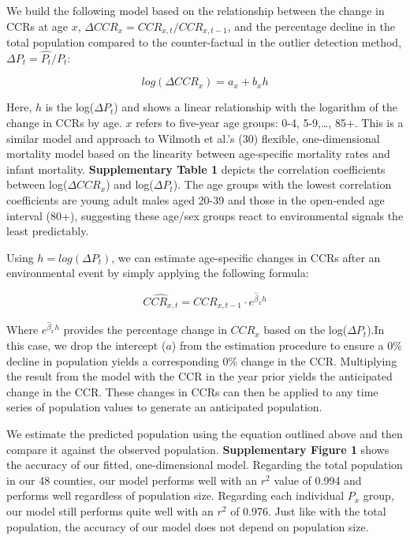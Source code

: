 \documentclass[9pt,twocolumn,twoside,]{pnas-new}
\begin{document}
We build the following model based on the relationship between the
change in CCRs at age \(x\), \(\Delta CCR_x = CCR_{x,t} / CCR_{x,t-1}\),
and the percentage decline in the total population compared to the
counter-factual in the outlier detection method,
\(\Delta P_t = \hat{P_t} / P_t\):

\[log(\Delta CCR_x) = a_x + b_xh \tag{3}\]

Here, \(h\) is the log(\(\Delta P_t\)) and shows a linear relationship
with the logarithm of the change in CCRs by age. \(x\) refers to
five-year age groups: 0-4, 5-9,\ldots, 85+. This is a similar model and
approach to Wilmoth et al.'s (30) flexible, one-dimensional mortality
model based on the linearity between age-specific mortality rates and
infant mortality. \textbf{Supplementary Table 1} depicts the correlation
coefficients between log(\(\Delta CCR_x\)) and log(\(\Delta P_t\)). The
age groups with the lowest correlation coefficients are young adult
males aged 20-39 and those in the open-ended age interval (80+),
suggesting these age/sex groups react to environmental signals the least
predictably.

Using \(h=log(\Delta P_t)\), we can estimate age-specific changes in
CCRs after an environmental event by simply applying the following
formula:

\[\hat{CCR_{x,t}} = CCR_{x,t-1} \cdot e^{\hat\beta_xh} \tag{4}\]

Where \(e^{\hat\beta_xh}\) provides the percentage change in \(CCR_x\)
based on the log(\(\Delta{P_t}\)).In this case, we drop the intercept
(\(a\)) from the estimation procedure to ensure a 0\% decline in
population yields a corresponding 0\% change in the CCR. Multiplying the
result from the model with the CCR in the year prior yields the
anticipated change in the CCR. These changes in CCRs can then be applied
to any time series of population values to generate an anticipated
population.

We estimate the predicted population using the equation outlined above
and then compare it against the observed population.
\textbf{Supplementary Figure 1} shows the accuracy of our fitted,
one-dimensional model. Regarding the total population in our 48
counties, our model performs well with an \(r^2\) value of 0.994 and
performs well regardless of population size. Regarding each individual
\(P_x\) group, our model still performs quite well with an \(r^2\) of
0.976. Just like with the total population, the accuracy of our model
does not depend on population size.
\end{document}
